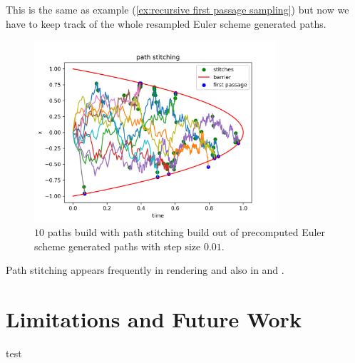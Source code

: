 \documentclass[a4paper,12pt]{article}
\begin{document}
\begin{example}
    This is the same as example (\ref{ex:recursive first passage sampling}) but now we have
    to keep track of the whole resampled Euler scheme generated paths.

    \begin{figure}[ht!]
        \centering
        \includegraphics[width=0.8\textwidth]{plots/path stitching para.png}
        \caption{ $10$ paths build with path stitching build out of
            precomputed Euler scheme generated paths with step size $0.01$.}
        \label{fig:path stitching para}
    \end{figure}
\end{example}




\begin{related}
    Path stitching appears frequently in rendering and also in \cite{das_sarma_fast_2015}
    and \cite{ji_reusing_2012}.
\end{related}

\section{Limitations and Future Work}
test
\end{document}
